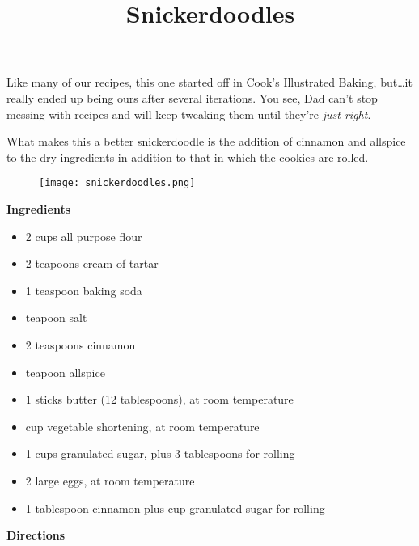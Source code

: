 \documentclass{article}
\title{Snickerdoodles}
\begin{document}
Like many of our recipes, this one started off in Cook's Illustrated Baking, but\dots it really
ended up being ours after several iterations. You see, Dad can't stop messing with recipes and will
keep tweaking them until they're \textit{just right}.

What makes this a better snickerdoodle is the addition of cinnamon and allspice to the
dry ingredients in addition to that in which the cookies are rolled.

\begin{figure}
    \centering
    \texttt{[image: snickerdoodles.png]}
\end{figure}

\textbf{Ingredients}

\begin{multicols}{2}
    \begin{itemize}
        \item 2 cups all purpose flour
        \item 2 teapoons cream of tartar
        \item 1 teaspoon baking soda
        \item {} teapoon salt
        \item 2 teaspoons cinnamon
        \item {} teapoon allspice

        \item 1 sticks butter (12 tablespoons), at room temperature
        \item {} cup vegetable shortening, at room temperature
        \item 1 cups granulated sugar, plus 3 tablespoons for rolling
        \item 2 large eggs, at room temperature
        \item 1 tablespoon cinnamon plus  cup granulated sugar for rolling
    \end{itemize}
\end{multicols}

\textbf{Directions}
\end{document}
